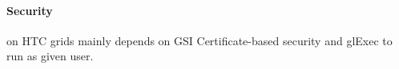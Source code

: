 \documentclass{sig-alternate}
\begin{document}
\paragraph{Security}
\panda on HTC grids mainly depends on GSI Certificate-based security and glExec
to run as given user.


\end{document}
